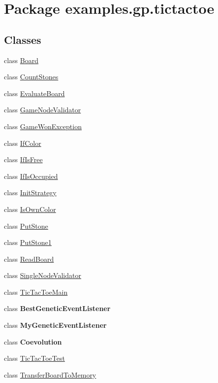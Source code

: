 \hypertarget{namespaceexamples_1_1gp_1_1tictactoe}{\section{Package examples.\-gp.\-tictactoe}
\label{namespaceexamples_1_1gp_1_1tictactoe}
}
\subsection*{Classes}
\begin{DoxyCompactItemize}
\item 
class \hyperlink{classexamples_1_1gp_1_1tictactoe_1_1_board}{Board}
\item 
class \hyperlink{classexamples_1_1gp_1_1tictactoe_1_1_count_stones}{Count\-Stones}
\item 
class \hyperlink{classexamples_1_1gp_1_1tictactoe_1_1_evaluate_board}{Evaluate\-Board}
\item 
class \hyperlink{classexamples_1_1gp_1_1tictactoe_1_1_game_node_validator}{Game\-Node\-Validator}
\item 
class \hyperlink{classexamples_1_1gp_1_1tictactoe_1_1_game_won_exception}{Game\-Won\-Exception}
\item 
class \hyperlink{classexamples_1_1gp_1_1tictactoe_1_1_if_color}{If\-Color}
\item 
class \hyperlink{classexamples_1_1gp_1_1tictactoe_1_1_if_is_free}{If\-Is\-Free}
\item 
class \hyperlink{classexamples_1_1gp_1_1tictactoe_1_1_if_is_occupied}{If\-Is\-Occupied}
\item 
class \hyperlink{classexamples_1_1gp_1_1tictactoe_1_1_init_strategy}{Init\-Strategy}
\item 
class \hyperlink{classexamples_1_1gp_1_1tictactoe_1_1_is_own_color}{Is\-Own\-Color}
\item 
class \hyperlink{classexamples_1_1gp_1_1tictactoe_1_1_put_stone}{Put\-Stone}
\item 
class \hyperlink{classexamples_1_1gp_1_1tictactoe_1_1_put_stone1}{Put\-Stone1}
\item 
class \hyperlink{classexamples_1_1gp_1_1tictactoe_1_1_read_board}{Read\-Board}
\item 
class \hyperlink{classexamples_1_1gp_1_1tictactoe_1_1_single_node_validator}{Single\-Node\-Validator}
\item 
class \hyperlink{classexamples_1_1gp_1_1tictactoe_1_1_tic_tac_toe_main}{Tic\-Tac\-Toe\-Main}
\item 
class {\bfseries Best\-Genetic\-Event\-Listener}
\item 
class {\bfseries My\-Genetic\-Event\-Listener}
\item 
class {\bfseries Coevolution}
\item 
class \hyperlink{classexamples_1_1gp_1_1tictactoe_1_1_tic_tac_toe_test}{Tic\-Tac\-Toe\-Test}
\item 
class \hyperlink{classexamples_1_1gp_1_1tictactoe_1_1_transfer_board_to_memory}{Transfer\-Board\-To\-Memory}
\end{DoxyCompactItemize}
